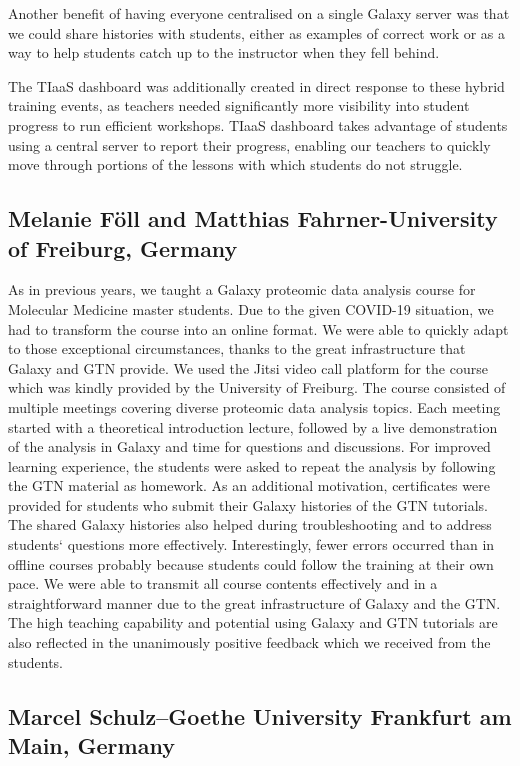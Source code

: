 Another benefit of having everyone centralised on a single Galaxy server was that we could share histories with students, either as examples of correct work or as a way to help students catch up to the instructor when they fell behind.

The TIaaS dashboard was additionally created in direct response to these hybrid training events, as teachers needed significantly more visibility into student progress to run efficient workshops. TIaaS dashboard takes advantage of students using a central server to report their progress, enabling our teachers to quickly move through portions of the lessons with which students do not struggle.

\subsection*{Melanie Föll and Matthias Fahrner-University of Freiburg, Germany}

As in previous years, we taught a Galaxy proteomic data analysis course for Molecular Medicine master students. Due to the given COVID-19 situation, we had to transform the course into an online format. We were able to quickly adapt to those exceptional circumstances, thanks to the great infrastructure that Galaxy and GTN provide. We used the Jitsi video call platform for the course which was kindly provided by the University of Freiburg. The course consisted of multiple meetings covering diverse proteomic data analysis topics. Each meeting started with a theoretical introduction lecture, followed by a live demonstration of the analysis in Galaxy and time for questions and discussions. For improved learning experience, the students were asked to repeat the analysis by following the GTN material as homework. As an additional motivation, certificates were provided for students who submit their Galaxy histories of the GTN tutorials. The shared Galaxy histories also helped during troubleshooting and to address students` questions more effectively. Interestingly, fewer errors occurred than in offline courses probably because students could follow the training at their own pace. We were able to transmit all course contents effectively and in a straightforward manner due to the great infrastructure of Galaxy and the GTN. The high teaching capability and potential using Galaxy and GTN tutorials are also reflected in the unanimously positive feedback which we received from the students.

\subsection*{Marcel Schulz–Goethe University Frankfurt am Main, Germany}


